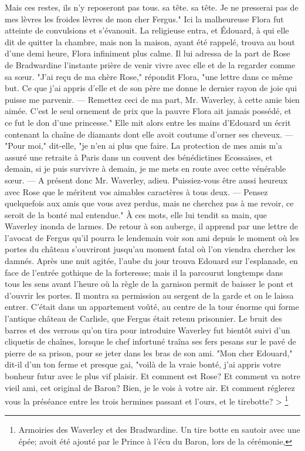 Mais ces restes, ils n'y reposeront pas tous. sa tête. sa tête.
Je ne presserai pas de mes lèvres les froides lèvres de mon cher Fergus."
Ici la malheureuse Flora fut atteinte de convulsions et s'évanouit. La religieuse entra, et Édouard, à qui elle dit de quitter la chambre, mais non la maison, ayant été rappelé, trouva au bout d'une\setcounter{page}{382} demi heure, Flora infiniment plus calme.
Il lui adressa de la part de Rose de Bradwardine l'instante prière de venir vivre avec elle et de la regarder comme sa sœur.
"J'ai reçu de ma chère Rose," répondit Flora, "une lettre dans ce même but. Ce que j'ai appris d'elle et de son père me donne le dernier rayon de joie qui puisse me parvenir. — Remettez ceci de ma part, Mr. Waverley, à cette amie bien aimée. C'est le seul ornement de prix que la pauvre Flora ait jamais possédé, et ce fut le don d'une princesse." Elle mit alors entre les mains d'Edouard un écrit contenant la chaîne de diamants dont elle avoit coutume d'orner ses cheveux. — "Pour moi," dit-elle, "je n'en ai plus que faire. La protection de mes amis m'a assuré une retraite à Paris dans un couvent des bénédictines Ecossaises, et demain, si je puis survivre à demain, je me mets en route avec cette vénérable sœur. — A présent donc Mr. Waverley, adieu. Puissiez-vous être aussi heureux avec Rose que le méritent vos aimables caractères à tous deux. — Pensez quelquefois aux amis que vous avez perdus, mais ne cherchez pas à me revoir, ce seroit de la bonté mal entendue."\setcounter{page}{383} À ces mots, elle lui tendit sa main, que Waverley inonda de larmes. De retour à son auberge, il apprend par une lettre de l'avocat de Fergus qu'il pourra le lendemain voir son ami depuis le moment où les portes du château s'ouvriront jusqu'au moment fatal où l'on viendra chercher les damnés.
Après une nuit agitée, l'aube du jour trouva Edouard sur l'esplanade, en face de l'entrée gothique de la forteresse; mais il la parcourut longtemps dans tous les sens avant l'heure où la règle de la garnison permit de baisser le pont et d'ouvrir les portes.
Il montra sa permission au sergent de la garde et on le laissa entrer. C'était dans un appartement voûté, au centre de la tour énorme qui forme l'antique château de Carlisle, que Fergus était retenu prisonnier. Le bruit des barres et des verrous qu'on tira pour introduire Waverley fut bientôt suivi d'un cliquetis de chaînes, lorsque le chef infortuné traîna ses fers pesans sur le pavé de pierre de sa prison, pour se jeter dans les bras de son ami.
"Mon cher Edouard," dit-il d'un ton ferme et presque gai, "voilà de la vraie bonté, j'ai appris votre bonheur futur avec\setcounter{page}{384} le plus vif plaisir. Et comment est Rose? Et comment va notre vieil ami, cet original de Baron? Bien, je le vois à votre air. Et comment réglerez vous la préséance entre les trois hermines passant et l'ours, et le tirebotte? > \footnote{Armoiries des Waverley et des Bradwardine. Un tire botte en sautoir avec une épée; avoit été ajouté par le Prince à l'écu du Baron, lors de la cérémonie,}
